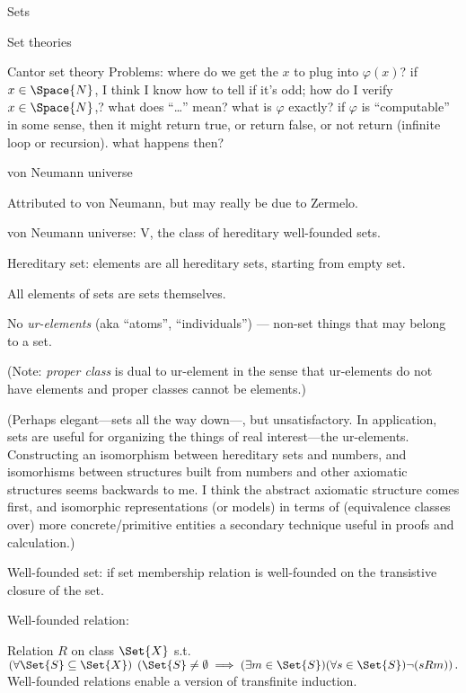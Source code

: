 \begin{plSection}{Sets}
\begin{plSection}{Set theories}
\begin{plSection}{Cantor set theory}
Problems: \hfill\break
where do we get the $x$ to plug into $\varphi(x)$?\hfill\break
if $x\in\Space{N}$, I think I know how to tell if it's odd;
how do I verify $x\in\Space{N}$,?\hfill\break
what does ``\dots'' mean?\hfill\break
what is $\varphi$ exactly?\hfill\break
if $\varphi$ is ``computable'' in some sense,
then it might return true, or return false, or not return
(infinite loop or recursion). what happens then?
\end{plSection}%
\begin{plSection}{von Neumann universe}
\label{sec:von_Neumann_universe}

Attributed to von Neumann, but may really be due to
Zermelo\cite{Zermelo:1930:SetTheory}.

von Neumann universe: \textsf{V}\cite{wiki:VonNeumannUniverse},
the class of hereditary well-founded sets.

Hereditary set: elements are all hereditary sets, 
starting from empty set\cite{wiki:HereditarySet}.

All elements of sets are sets themselves.

No \textsl{ur-elements}\cite{wiki:Urelement} 
(aka ``atoms'', ``individuals'') ---
non-set things that may belong to a set.

(Note: \textsl{proper class} is dual to ur-element in the sense that
ur-elements do not have elements and proper classes cannot be 
elements.)

(Perhaps elegant---sets all the way down---, but unsatisfactory. 
In application, sets are useful for organizing the things
of real interest---the ur-elements.
Constructing an isomorphism between hereditary sets
and numbers, and isomorhisms between structures built
from numbers and other axiomatic structures seems
backwards to me.
I think the abstract axiomatic structure comes first, 
and isomorphic representations (or models) in terms of 
(equivalence classes over) more concrete/primitive
entities a secondary technique useful in proofs and calculation.)

Well-founded set: if set membership relation
is well-founded on the transistive closure of the set.

Well-founded relation\cite{wiki:WellFoundedRelation}: 
 
Relation $R$ on class $\Set{X}$ s.t. 
$(\forall \Set{S} \subseteq \Set{X})
\; \left(\Set{S} \neq \emptyset \implies 
(\exists m \in \Set{S})(\forall s\in \Set{S})\lnot (sRm)\right).$
Well-founded relations enable a version of transfinite induction.


\end{plSection}
\end{plSection}
\end{plSection}
